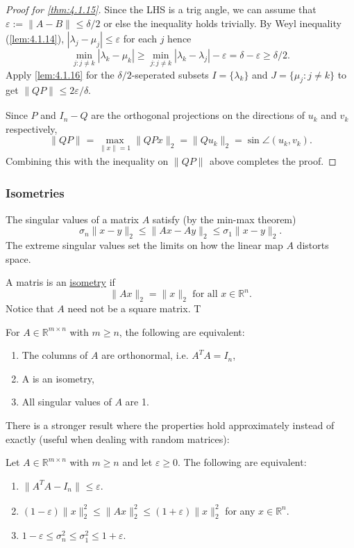 \begin{proof}[Proof for \cref{thm:4.1.15}]
Since the LHS is a trig angle, we can assume that $\varepsilon := \lVert A - B \rVert_{} \leq \delta / 2$ or 
else the inequality holds trivially. By Weyl inequality (\cref{lem:4.1.14}), $|\lambda_j - \mu_j| 
\leq \varepsilon$ for each $j$ hence 
\[ \min_{j: j \neq k} |\lambda_k - \mu_k| \geq \min_{j: j \neq k} |\lambda_k - \lambda_j| - \varepsilon 
= \delta - \varepsilon \geq \delta/2. \]
Apply \cref{lem:4.1.16} for the $\delta/2$-seperated subsets $I = \{\lambda_k\}$ and $J = \{\mu_j: 
j \neq k\}$ to get $\lVert QP \rVert_{} \leq 2 \varepsilon / \delta$. 

Since $P$ and $I_n - Q$ are the orthogonal projections on the directions of $u_k$ and $v_k$ respectively, 
\[ \lVert QP \rVert_{} = \max_{\lVert x \rVert_{} = 1} \lVert QPx \rVert_{2} 
= \lVert Q u_k \rVert_{2} = \sin{\angle(u_k, v_k)}. \]
Combining this with the inequality on $\lVert QP \rVert_{}$ above completes the proof.
\end{proof}

\subsubsection{Isometries}
The singular values of a matrix $A$ satisfy (by the min-max theorem)
\[ \sigma_n \lVert x - y \rVert_{2} \leq \lVert Ax - Ay \rVert_{2} \leq \sigma_1 \lVert x - y \rVert_{2}. \]
The extreme singular values set the limits on how the linear map $A$ distorts space.

A matris is an \underline{isometry} if 
\[ \lVert Ax \rVert_{2} = \lVert x \rVert_{2} \text{ for all } x \in \mathbb{R}^n. \]
Notice that $A$ need not be a square matrix. T

For $A \in \mathbb{R}^{m \times n}$ with $m \geq n$, the following are equivalent: 
\begin{enumerate}
	\item The columns of $A$ are orthonormal, i.e. $A^T A = I_n$, 
	\item A is an isometry, 
	\item All singular values of $A$ are 1.
\end{enumerate}

There is a stronger result where the properties hold approximately instead of exactly (useful when 
dealing with random matrices): 
\begin{lemma}
\label{lem:4.1.17}
Let $A \in \mathbb{R}^{m \times n}$ with $m \geq n$ and let $\varepsilon \geq 0$. The following are equivalent: 
\begin{enumerate}
	\item $\lVert A^T A - I_n \rVert_{} \leq \varepsilon$.
	\item $(1 - \varepsilon)\lVert x \rVert_{2}^2 \leq \lVert Ax \rVert_{2}^2 \leq 
	(1 + \varepsilon)\lVert x \rVert_{2}^2$ for any $x \in \mathbb{R}^n$.
	\item $1 - \varepsilon \leq \sigma_n^2 \leq \sigma_1^2 \leq 1 + \varepsilon$.
\end{enumerate}
\end{lemma}

